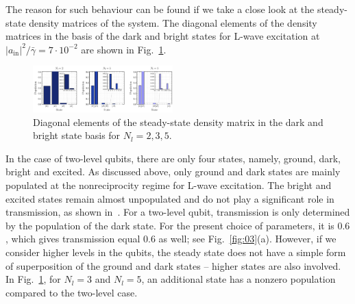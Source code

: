 \documentclass[lettersize,journal]{IEEEtran}
\begin{document}
The reason for such behaviour can be found if we take a close look at the steady-state density matrices of the system.
The diagonal elements of the density matrices in the basis of the dark and bright states for L-wave excitation at $|a_\mathrm{in}|^2 / \bar{\gamma} = 7 \cdot 10^{-2}$ are shown in Fig.~\ref{fig:04}.
\begin{figure}[h!]
    \centering
    \includegraphics[width=0.48\textwidth]{fig_7}
    \caption{Diagonal elements of the steady-state density matrix in the dark and bright state basis for $N_l = 2, 3, 5$.}
    \label{fig:04}
\end{figure}
In the case of two-level qubits, there are only four states, namely, ground, dark, bright and excited.
As discussed above, only ground and dark states are mainly populated at the nonreciprocity regime for L-wave excitation.
The bright and excited states remain almost unpopulated and do not play a significant role in transmission, as shown in~\cite{muller_nonreciprocal_2017}.
For a two-level qubit, transmission is only determined by the population of the dark state. 
For the present choice of parameters, it is $0.6$, which gives transmission equal $0.6$ as well; see Fig.~\ref{fig:03}(a).
However, if we consider higher levels in the qubits, the steady state does not have a simple form of superposition of the ground and dark states -- higher states are also involved.
In Fig.~\ref{fig:04}, for $N_l = 3$ and $N_l = 5$, an additional state has a nonzero population compared to the two-level case.
\end{document}
